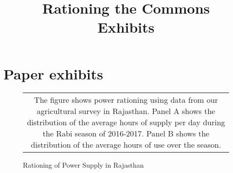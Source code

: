 \documentclass{article}
\title{Rationing the Commons \\ Exhibits}
\numberwithin{table}{section}
\begin{document}
	
	\maketitle
	
	\tableofcontents
	
	\clearpage
	\listoffigures
	\listoftables
	
\clearpage	
\section{Paper exhibits}

\begin{figure}[h]
	\centering \caption{Rationing of Power Supply in Rajasthan\label{fig:rationing}}
	\subfiguretopcaptrue
	\begin{tabular*}{1.0\textwidth}{c}
		\multicolumn{1}{p{1.0\hsize}}{\footnotesize The figure shows power rationing using data from our agricultural survey in Rajasthan. Panel A shows the distribution of the average hours of supply per day during the Rabi season of 2016-2017. Panel B shows the distribution of the average hours of use over the season.}\\
	\end{tabular*}
\end{figure}

\end{document}
